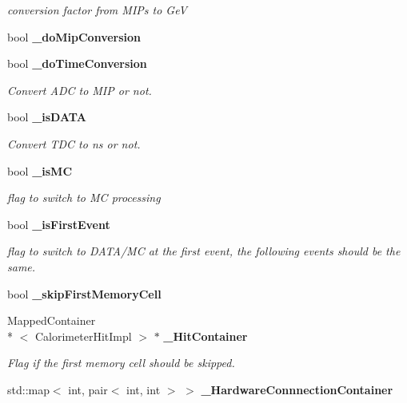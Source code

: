 \begin{DoxyCompactItemize}
\begin{DoxyCompactList}\small\item\em conversion factor from M\-I\-Ps to Ge\-V \end{DoxyCompactList}\item 
bool {\bfseries \-\_\-do\-Mip\-Conversion}\label{classCALICE_1_1Ahc2CalibrateProcessor_a263941e7f6da582dd0e4336c2d0443bf}

\item 
bool {\bf \-\_\-do\-Time\-Conversion}\label{classCALICE_1_1Ahc2CalibrateProcessor_aacfee6708f5ebda2f4f14273a508c345}

\begin{DoxyCompactList}\small\item\em Convert A\-D\-C to M\-I\-P or not. \end{DoxyCompactList}\item 
bool {\bf \-\_\-is\-D\-A\-T\-A}
\begin{DoxyCompactList}\small\item\em Convert T\-D\-C to ns or not. \end{DoxyCompactList}\item 
bool {\bf \-\_\-is\-M\-C}\label{classCALICE_1_1Ahc2CalibrateProcessor_ab5809d2c7f3a1e6cf7deb8ed8fb48f90}

\begin{DoxyCompactList}\small\item\em flag to switch to M\-C processing \end{DoxyCompactList}\item 
bool {\bf \-\_\-is\-First\-Event}
\begin{DoxyCompactList}\small\item\em flag to switch to D\-A\-T\-A/\-M\-C at the first event, the following events should be the same. \end{DoxyCompactList}\item 
bool {\bfseries \-\_\-skip\-First\-Memory\-Cell}\label{classCALICE_1_1Ahc2CalibrateProcessor_a26ecaa70b84b39225a4b4bd772f5a22c}

\item 
Mapped\-Container\\*
$<$ Calorimeter\-Hit\-Impl $>$ $\ast$ {\bf \-\_\-\-Hit\-Container}
\begin{DoxyCompactList}\small\item\em Flag if the first memory cell should be skipped. \end{DoxyCompactList}\item 
std\-::map$<$ int, pair$<$ int, int $>$ $>$ {\bf \-\_\-\-Hardware\-Connnection\-Container}\label{classCALICE_1_1Ahc2CalibrateProcessor_a34cb42883a07b2ef17026d96405e608b}


\end{DoxyCompactItemize}
